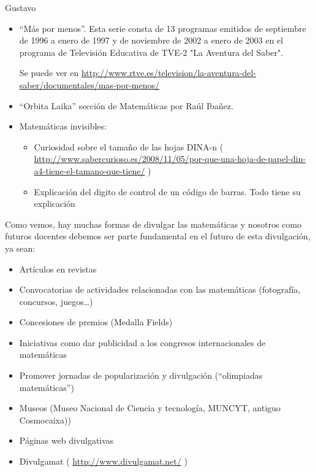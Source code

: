 \begin{opin}{\guscolor}{Gustavo}
\begin{itemize}
Se puede ver en 
\href{http://www.rtve.es/alacarta/videos/universo-matematico/} {http://www.rtve.es/alacarta/videos/universo-matematico/} 
\item “Más por menos”. Esta serie consta de 13 programas emitidos de septiembre de 1996 a enero de 1997 y de noviembre de 2002 a enero de 2003 en el programa de Televisión Educativa de TVE-2 "La Aventura del Saber".

Se puede ver en 
\href{http://www.rtve.es/television/la-aventura-del-saber/documentales/mas-por-menos/} {http://www.rtve.es/television/la-aventura-del-saber/documentales/mas-por-menos/} 
\item “Orbita Laika” sección de Matemáticas por Raúl Ibañez.
\item Matemáticas invisibles:
\begin{itemize}
\item Curiosidad sobre el tamaño de las hojas DINA-n (
\href{http://www.sabercurioso.es/2008/11/05/por-que-una-hoja-de-papel-din-a4-tiene-el-tamano-que-tiene/}{http://www.sabercurioso.es/2008/11/05/por-que-una-hoja-de-papel-din-a4-tiene-el-tamano-que-tiene/}
)
\item Explicación del digito de control de un código de barras. Todo tiene su explicación
\end{itemize}
\end{itemize}



Como vemos, hay muchas formas de divulgar las matemáticas y nosotros como futuros docentes debemos ser parte fundamental en el futuro de esta divulgación, ya sean:

\begin{itemize}
\item Artículos en revistas  
\item Convocatorias de actividades relacionadas con las matemáticas (fotografía, concursos, juegos…)
\item Concesiones de premios (Medalla Fields) 
\item Iniciativas como dar publicidad a los congresos internacionales de matemáticas 
\item Promover jornadas de popularización y divulgación  (“olimpiadas matemáticas”) 
\item Museos (Museo Nacional de Ciencia y tecnología, MUNCYT, antiguo Cosmocaixa)) 
\item Páginas web divulgativas
\item Divulgamat (
\href{http://www.divulgamat.net/}{http://www.divulgamat.net/}
)
\end{itemize}


\end{opin}
